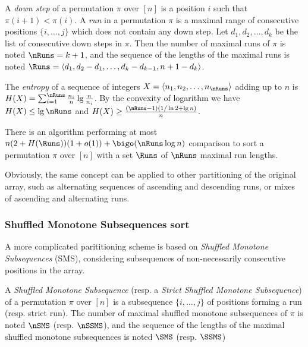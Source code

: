 \begin{definition}
  A \emph{down step} of a permutation $\pi$ over $[n]$ is a position $i$ 
  such that $\pi(i+1)<\pi(i)$.  
  A \emph{run} in a permutation $\pi$ is a maximal range of
  consecutive positions $\{i,\ldots,j\}$ which does not contain any
  down step.
  Let $d_1,d_2, \ldots,d_k$ be the list of consecutive down steps in $\pi$.
  Then the number of maximal runs of $\pi$ is noted $\nRuns = k+1$, 
  and the sequence of the lengths of the maximal runs is noted
  $\Runs = \langle d_1,d_2-d_1, \ldots,d_k-d_{k-1},n+1-d_k \rangle$.
\end{definition}

\begin{definition}
  The {\em entropy} of a sequence of integers $X=\langle n_1,n_2,
  \ldots, n_\nRuns\rangle$ adding up to $n$ is $H(X) =
  \sum_{i=1}^\nRuns\frac{n_i}{n} \lg \frac{n}{n_i}$.
  By the convexity of logarithm we have $H(X) \le \lg \nRuns$ and
  $H(X) \ge \frac{(\nRuns-1)(1/\ln 2 + \lg n)}{n}$.
\label{def:entrop}
\end{definition}

\begin{theorem}
  There is an algorithm performing at most $n(2+H(\Runs))(1+o(1)) +
  \bigo(\nRuns\log n)$ comparison to sort a permutation $\pi$ over
  $[n]$ with a set $\Runs$ of $\nRuns$ maximal run lengths.
\end{theorem}

Obviously, the same concept can be applied to other partitioning of
the original array, such as alternating sequences of ascending and
descending runs, or mixes of ascending and alternating runs.

\subsubsection{Shuffled Monotone Subsequences  sort}
\label{sec:sms-sort}

A more complicated parititioning scheme is based on \emph{Shuffled
  Monotone Subsequences} (SMS), considering subsequences of
non-necessarily consecutive positions in the array.

\begin{definition}
  A \emph{Shuffled Monotone Subsequence} (resp. a \emph{Strict
    Shuffled Monotone Subsequence}) of a permutation $\pi$ over $[n]$
  is a subsequence $\{i,\ldots,j\}$ of positions forming a run
  (resp. strict run).
  The number of maximal shuffled monotone subsequences of $\pi$ is
  noted $\nSMS$ (resp. $\nSSMS$), and the sequence of the lengths of
  the maximal shuffled monotone subsequences is noted $\SMS$
  (resp. $\SSMS$)
\end{definition}

